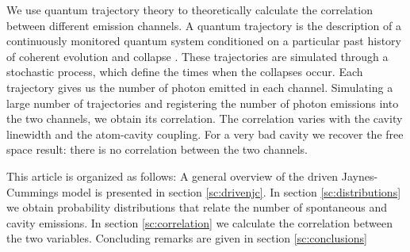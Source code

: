 \documentclass[conference]{IEEEtran}
\begin{document}
We use quantum trajectory theory to theoretically calculate the
correlation between different emission channels. A quantum trajectory
is the description of a continuously monitored quantum system
conditioned on a particular past history of coherent evolution and
collapse \cite{Carmichael1993Open}. These trajectories are simulated
through a stochastic process, which define the times when the
collapses occur. Each trajectory gives us the number of photon emitted
in each channel. Simulating a large number of trajectories and
registering the number of photon emissions into the two channels, we
obtain its correlation. The correlation varies with the cavity
linewidth and the atom-cavity coupling. For a very bad cavity we
recover the free space result: there is no correlation between the two
channels.


This article is organized as follows: A general overview of the driven
Jaynes-Cummings model is presented in section \ref{sc:drivenjc}. In
section \ref{sc:distributions} we obtain probability distributions
that relate the number of spontaneous and cavity emissions. In section
\ref{sc:correlation} we calculate the correlation between the two variables.
Concluding remarks are given in section \ref{sc:conclusions}
\end{document}
